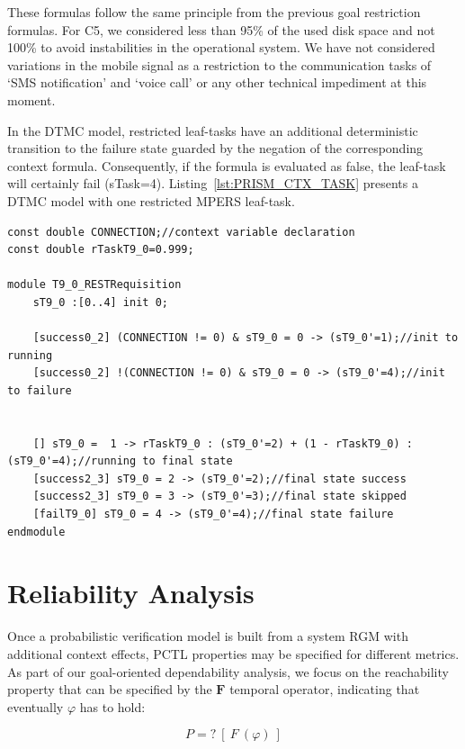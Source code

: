 These formulas follow the same principle from the previous goal restriction formulas. For C5, we considered less than 95\% of the used disk space and not 100\% to avoid instabilities in the operational system. We have not considered variations in the mobile signal as a restriction to the communication tasks of `SMS notification' and `voice call' or any other technical impediment at this moment. 

In the DTMC model, restricted leaf-tasks have an additional deterministic transition to the failure state guarded by the negation of the corresponding context formula. Consequently, if the formula is evaluated as false, the leaf-task will certainly fail (sTask=4). Listing~\ref{lst:PRISM_CTX_TASK} presents a DTMC model with one restricted MPERS leaf-task.
\medskip

\begin{lstlisting}[language=Prism, caption={Variable declaration and module representing a leaf-task restricted by a context.},label={lst:PRISM_CTX_TASK}] 
const double CONNECTION;//context variable declaration
const double rTaskT9_0=0.999;

module T9_0_RESTRequisition
	sT9_0 :[0..4] init 0;
	
	[success0_2] (CONNECTION != 0) & sT9_0 = 0 -> (sT9_0'=1);//init to running
	[success0_2] !(CONNECTION != 0) & sT9_0 = 0 -> (sT9_0'=4);//init to failure


	[] sT9_0 =  1 -> rTaskT9_0 : (sT9_0'=2) + (1 - rTaskT9_0) : (sT9_0'=4);//running to final state
	[success2_3] sT9_0 = 2 -> (sT9_0'=2);//final state success
	[success2_3] sT9_0 = 3 -> (sT9_0'=3);//final state skipped
	[failT9_0] sT9_0 = 4 -> (sT9_0'=4);//final state failure
endmodule
\end{lstlisting}

\section{Reliability Analysis}

Once a probabilistic verification model is built from a system RGM with additional context effects, PCTL properties may be specified for different metrics. As part of our goal-oriented dependability analysis, we focus on the reachability property that can be specified by the $\textbf{F}$ temporal operator, indicating that eventually $\varphi$ has to hold:

\begin{equation}\label{eq:PROB_EXISTANCE}
P=?\ [\ F\ (\varphi)\ ]
\end{equation}

